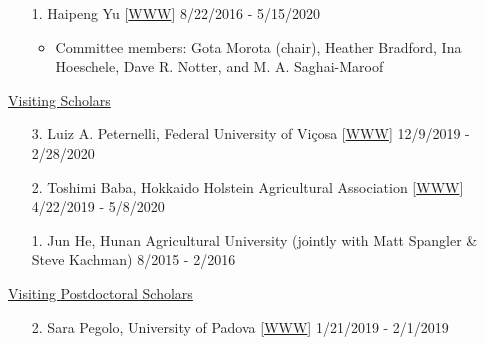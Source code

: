 \documentclass[margin,line,10pt]{res}
\begin{document}
\begin{resume}
\begin{enumerate}
    \vspace{0.3cm}

  \item [1.] Haipeng Yu [\textcolor{blue}{\href{https://haipengu.github.io/}{WWW}}]  \hfill 8/22/2016 - 5/15/2020
    \begin{itemize}
     \item  Committee members: Gota Morota (chair), Heather Bradford, Ina Hoeschele, Dave R. Notter, and M. A. Saghai-Maroof
    \end{itemize}
\end{enumerate}








\begin{flushleft}
\hspace{0.2cm} \underline{Visiting Scholars}
\end{flushleft}
\begin{enumerate}

\item [3.] Luiz A. Peternelli, Federal University of Vi\c cosa [\textcolor{blue}{\href{http://www.dpi.ufv.br/~peternelli/}{WWW}}]  \hfill 12/9/2019 - 2/28/2020

  \vspace{0.3cm}

      
\item [2.] Toshimi Baba, Hokkaido Holstein Agricultural Association [\textcolor{blue}{\href{https://researchmap.jp/t-baba/?lang=english}{WWW}}]  \hfill  4/22/2019 - 5/8/2020
  
  \vspace{0.3cm}

\item [1.] Jun He, Hunan Agricultural University (jointly with Matt Spangler \& Steve Kachman)  \hfill  8/2015 - 2/2016 
\end{enumerate}



\begin{flushleft}
\hspace{0.2cm} \underline{Visiting Postdoctoral Scholars}
\end{flushleft}
\begin{enumerate}
\item [2.] Sara Pegolo,  University of Padova [\textcolor{blue}{\href{https://www.researchgate.net/profile/Sara_Pegolo}{WWW}}]  \hfill 1/21/2019 - 2/1/2019
  
  \vspace{0.3cm}


\end{enumerate}
\end{resume}
\end{document}
